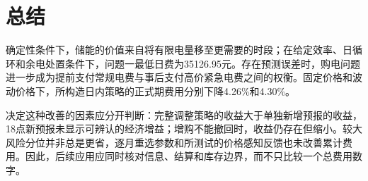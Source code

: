 \section{总结}
确定性条件下，储能的价值来自将有限电量移至更需要的时段；在给定效率、日循环和余电处置条件下，问题一最低日费为35126.95元。存在预测误差时，购电问题进一步成为提前支付常规电费与事后支付高价紧急电费之间的权衡。固定价格和波动价格下，所构造日内策略的正式期费用分别下降4.26\%和4.30\%。

决定这种改善的因素应分开判断：完整调整策略的收益大于单独新增预报的收益，18点新预报未显示可辨认的经济增益；增购不能撤回时，收益仍存在但缩小。较大风险分位并非总是更省，逐月重选参数和所测试的价格感知反馈也未改善累计费用。因此，后续应用应同时核对信息、结算和库存边界，而不只比较一个总费用数字。
\label{end:body}
